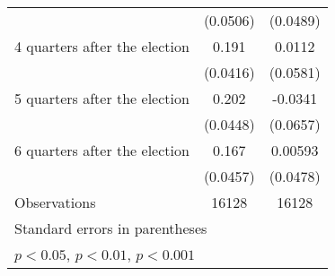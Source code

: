 \begin{table}[htbp]
\begin{tabular}{l*{2}{c}}
                    &    (0.0506)         &    (0.0489)         \\
[1em]
 4 quarters after the election&       0.191\sym{***}&      0.0112         \\
                    &    (0.0416)         &    (0.0581)         \\
[1em]
 5 quarters after the election&       0.202\sym{***}&     -0.0341         \\
                    &    (0.0448)         &    (0.0657)         \\
[1em]
 6 quarters after the election&       0.167\sym{***}&     0.00593         \\
                    &    (0.0457)         &    (0.0478)         \\
\hline
Observations        &       16128         &       16128         \\
\hline\hline
\multicolumn{3}{l}{\footnotesize Standard errors in parentheses}\\
\multicolumn{3}{l}{\footnotesize \sym{*} \(p<0.05\), \sym{**} \(p<0.01\), \sym{***} \(p<0.001\)}\\
\end{tabular}
\end{table}
